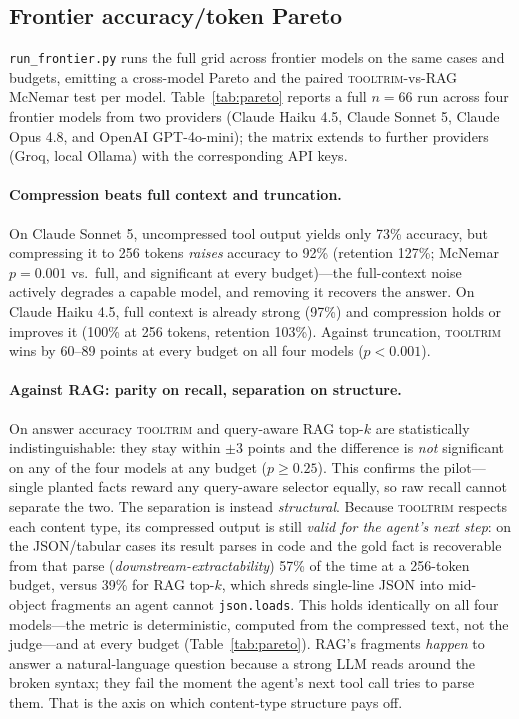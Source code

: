 \documentclass[11pt]{article}
\newcommand{\tooltrim}{\textsc{tooltrim}}
\begin{document}
\subsection{Frontier accuracy/token Pareto}
\label{sec:pareto-ref}
\texttt{run\_frontier.py} runs the full grid across frontier models on the same
cases and budgets, emitting a cross-model Pareto and the paired \tooltrim-vs-RAG
McNemar test per model. Table~\ref{tab:pareto} reports a full $n{=}66$ run across
four frontier models from two providers (Claude Haiku 4.5, Claude Sonnet 5, Claude
Opus 4.8, and OpenAI GPT-4o-mini); the matrix extends to further providers (Groq,
local Ollama) with the corresponding API keys.

\paragraph{Compression beats full context and truncation.} On Claude Sonnet 5,
uncompressed tool output yields only 73\% accuracy, but compressing it to 256
tokens \emph{raises} accuracy to 92\% (retention 127\%; McNemar $p{=}0.001$ vs.\
full, and significant at every budget)---the full-context noise actively degrades
a capable model, and removing it recovers the answer. On Claude Haiku 4.5, full
context is already strong (97\%) and compression holds or improves it (100\% at
256 tokens, retention 103\%). Against truncation, \tooltrim{} wins by 60--89
points at every budget on all four models ($p<0.001$).

\paragraph{Against RAG: parity on recall, separation on structure.} On
answer accuracy \tooltrim{} and query-aware RAG top-$k$ are statistically
indistinguishable: they stay within $\pm 3$ points and the difference is
\emph{not} significant on any of the four models at any budget ($p\geq 0.25$). This
confirms the pilot---single planted facts reward any query-aware selector
equally, so raw recall cannot separate the two. The separation is instead
\emph{structural}. Because \tooltrim{} respects each content type, its compressed
output is still \emph{valid for the agent's next step}: on the JSON/tabular cases
its result parses in code and the gold fact is recoverable from that parse
(\emph{downstream-extractability}) 57\% of the time at a 256-token budget, versus
39\% for RAG top-$k$, which shreds single-line JSON into mid-object fragments an
agent cannot \texttt{json.loads}. This holds identically on all four models---the
metric is deterministic, computed from the compressed text, not the judge---and
at every budget (Table~\ref{tab:pareto}). RAG's fragments \emph{happen} to answer
a natural-language question because a strong LLM reads around the broken syntax;
they fail the moment the agent's next tool call tries to parse them. That is the
axis on which content-type structure pays off.
\end{document}
